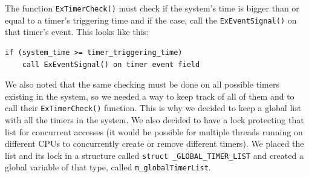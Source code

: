 The function \lstinline|ExTimerCheck()| must check if the system's time is bigger than or equal to a timer's triggering time and if the case, call the \lstinline|ExEventSignal()| on that timer's event. This looks like this:
\begin{lstlisting}
if (system_time >= timer_triggering_time)
    call ExEventSignal() on timer event field
\end{lstlisting}


We also noted that the same checking must be done on all possible timers existing in the system, so we needed a way to keep track of all of them and to call their \lstinline|ExTimerCheck()| function. This is why we decided to keep a global list with all the timers in the system. We also decided to have a lock protecting that list for concurrent accesses (it would be possible for multiple threads running on different CPUs to concurrently create or remove different timers). We placed the list and its lock in a structure called \lstinline|struct _GLOBAL_TIMER_LIST| and created a global variable of that type, called \lstinline|m_globalTimerList|.

